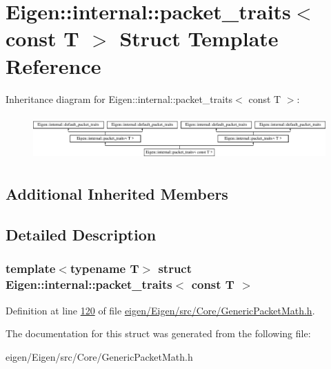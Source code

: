 \hypertarget{struct_eigen_1_1internal_1_1packet__traits_3_01const_01_t_01_4}{}\section{Eigen\+:\+:internal\+:\+:packet\+\_\+traits$<$ const T $>$ Struct Template Reference}
\label{struct_eigen_1_1internal_1_1packet__traits_3_01const_01_t_01_4}
Inheritance diagram for Eigen\+:\+:internal\+:\+:packet\+\_\+traits$<$ const T $>$\+:\begin{figure}[H]
\begin{center}
\leavevmode
\includegraphics[height=1.728395cm]{struct_eigen_1_1internal_1_1packet__traits_3_01const_01_t_01_4}
\end{center}
\end{figure}
\subsection*{Additional Inherited Members}


\subsection{Detailed Description}
\subsubsection*{template$<$typename T$>$\newline
struct Eigen\+::internal\+::packet\+\_\+traits$<$ const T $>$}



Definition at line \hyperlink{eigen_2_eigen_2src_2_core_2_generic_packet_math_8h_source_l00120}{120} of file \hyperlink{eigen_2_eigen_2src_2_core_2_generic_packet_math_8h_source}{eigen/\+Eigen/src/\+Core/\+Generic\+Packet\+Math.\+h}.



The documentation for this struct was generated from the following file\+:\begin{DoxyCompactItemize}
\item 
eigen/\+Eigen/src/\+Core/\+Generic\+Packet\+Math.\+h\end{DoxyCompactItemize}
